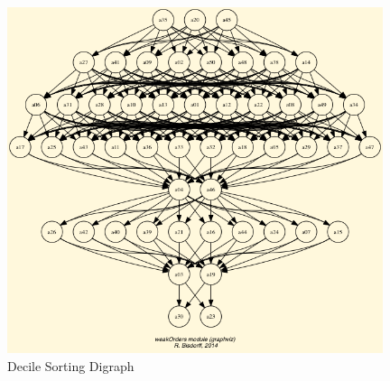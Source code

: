 \documentclass[a4paper]{article}
\begin{document}
\begin{figure}[H]
	\centering
	\includegraphics[width=11cm]{figures/sorted_deciles_graph}
	\caption{Decile Sorting Digraph}
	\label{fig:sorting_graph}
\end{figure}



\printbibliography
\end{document}
